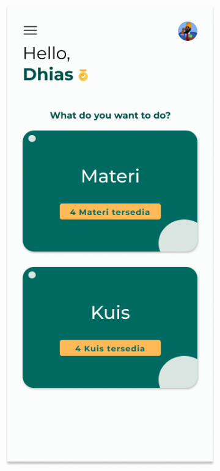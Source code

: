 \begin{figure}[H]
	\centering
	\begin{subfigure}[b]{0.24\textwidth}
		\centering
	  \includegraphics[width=\linewidth]{contents/chapter-3/images/HF-Main.png}

\end{subfigure}
\end{figure}
